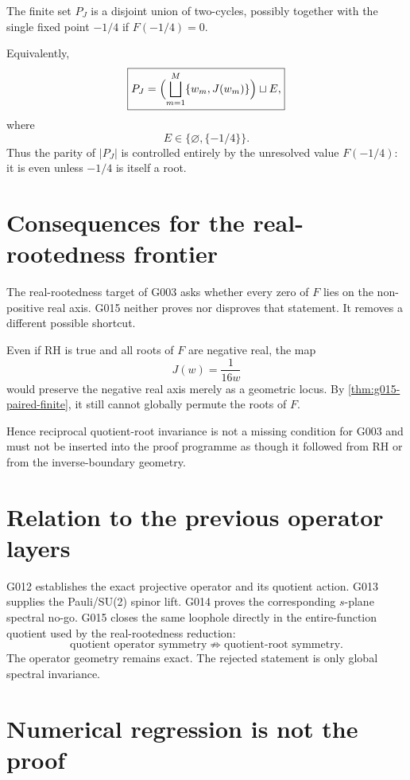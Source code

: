 \begin{theorem}
\label{thm:g015-orbit-classification}
The finite set $P_J$ is a disjoint union of two-cycles, possibly together with
the single fixed point $-1/4$ if $F(-1/4)=0$.
\end{theorem}

Equivalently,
\[
 \boxed{
 P_J
 =\Bigl(\bigsqcup_{m=1}^{M}\{w_m,J(w_m)\}\Bigr)
 \sqcup E,
 }
\]
where
\[
 E\in\{\varnothing,\{-1/4\}\}.
\]
Thus the parity of $|P_J|$ is controlled entirely by the unresolved value
$F(-1/4)$: it is even unless $-1/4$ is itself a root.

\section{Consequences for the real-rootedness frontier}

The real-rootedness target of G003 asks whether every zero of $F$ lies on the
non-positive real axis.  G015 neither proves nor disproves that statement.
It removes a different possible shortcut.

Even if RH is true and all roots of $F$ are negative real, the map
\[
 J(w)=\frac1{16w}
\]
would preserve the negative real axis merely as a geometric locus.  By
\cref{thm:g015-paired-finite}, it still cannot globally permute the roots of
$F$.

Hence reciprocal quotient-root invariance is not a missing condition for
G003 and must not be inserted into the proof programme as though it followed
from RH or from the inverse-boundary geometry.

\section{Relation to the previous operator layers}

G012 establishes the exact projective operator and its quotient action.
G013 supplies the Pauli/SU(2) spinor lift.  G014 proves the corresponding
$s$-plane spectral no-go.  G015 closes the same loophole directly in the
entire-function quotient used by the real-rootedness reduction:
\[
 \boxed{
 \text{quotient operator symmetry}
 \not\Rightarrow
 \text{quotient-root symmetry}.
 }
\]
The operator geometry remains exact.  The rejected statement is only global
spectral invariance.

\section{Numerical regression is not the proof}

